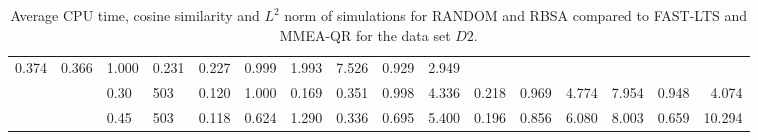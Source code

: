 \documentclass[thesis=B,english]{FITthesis}[2012/10/20]
\begin{document}
\begin{table}[h!]
\begin{adjustbox}{angle=90}
{\begin{tabular}{ll|l|l|r|r|r|r|r|r|r|r|r|r|r|r|}
 0.374 &   0.366 &  1.000 &  0.231 &  0.227 &  0.999 &  1.993 &  7.526 &  0.929 &   2.949 \\     &   & 0.30 & 503 &    0.120 &  1.000 &  0.169 &   0.351 &  0.998 &  4.336 &  0.218 &  0.969 &  4.774 &  7.954 &  0.948 &   4.074 \\     &   & 0.45 & 503 &    0.118 &  0.624 &  1.290 &   0.336 &  0.695 &  5.400 &  0.196 &  0.856 &  6.080 &  8.003 &  0.659 &  10.294 \\
                         
                 \hline
                \end{tabular}
			}
			
\end{adjustbox}
    
    \caption{Average CPU time, cosine similarity and $L^2$ norm of simulations for RANDOM and RBSA  compared to FAST-LTS and MMEA-QR for the data set $D2$.}
    \label{table:randim:2}
\end{table}
\end{document}
